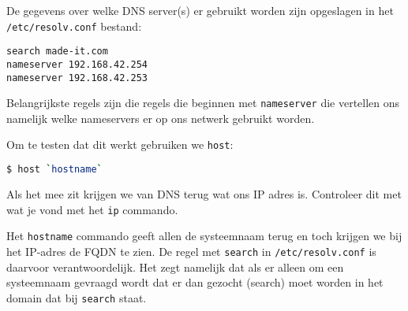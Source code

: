 De gegevens over welke DNS server(s) er gebruikt worden zijn opgeslagen in het \texttt{/etc/resolv.conf} bestand:
\begin{lstlisting}[lanuage=bash]
search made-it.com
nameserver 192.168.42.254
nameserver 192.168.42.253
\end{lstlisting}
Belangrijkste regels zijn die regels die beginnen met \texttt{nameserver} die vertellen ons namelijk welke nameservers er op ons netwerk gebruikt worden.

Om te testen dat dit werkt gebruiken we \texttt{host}:
\begin{lstlisting}[language=bash]
$ host `hostname`
\end{lstlisting}
Als het mee zit krijgen we van DNS terug wat ons IP adres is. Controleer dit met wat je vond met het \texttt{ip} commando.

Het \texttt{hostname} commando geeft allen de systeemnaam terug en toch krijgen we bij het IP-adres de FQDN te zien. De regel met \texttt{search} in \texttt{/etc/resolv.conf} is daarvoor verantwoordelijk. Het zegt namelijk dat als er alleen om een systeemnaam gevraagd wordt dat er dan gezocht (search) moet worden in het domain dat bij \texttt{search} staat.

